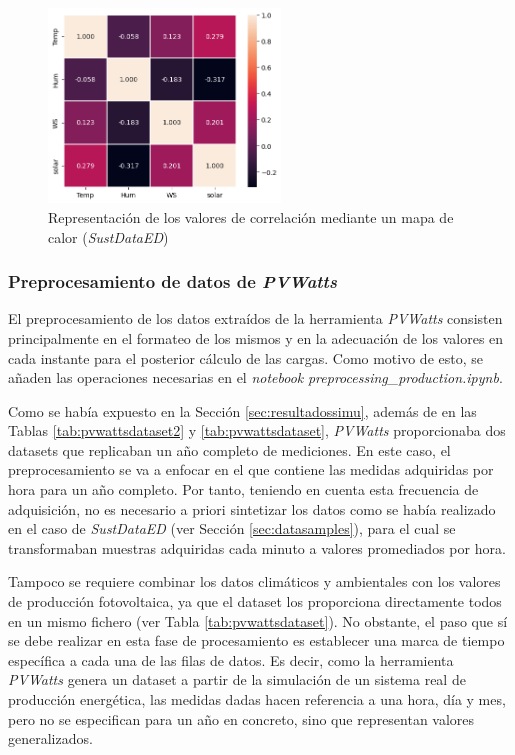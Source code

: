 \begin{figure}[H]
  \centering
  \includegraphics[width=0.55\textwidth]{img/diseno/corr2.png}
  \caption{Representación de los valores de correlación mediante un mapa de calor (\textit{SustDataED})}
  \label{fig:corr2}
\end{figure}

\subsubsection{Preprocesamiento de datos de \textit{PVWatts}}
\label{sec:preprocpvwatts}

El preprocesamiento de los datos extraídos de la herramienta \textit{PVWatts} consisten principalmente en el formateo de los mismos y en la adecuación de los valores en cada instante para el posterior cálculo de las cargas. Como motivo de esto, se añaden las operaciones necesarias en el \textit{notebook} \textit{preprocessing\_production.ipynb}. 

\vspace{3mm}

Como se había expuesto en la Sección \ref{sec:resultadossimu}, además de en las Tablas \ref{tab:pvwattsdataset2} y \ref{tab:pvwattsdataset}, \textit{PVWatts} proporcionaba dos datasets que replicaban un año completo de mediciones. En este caso, el preprocesamiento se va a enfocar en el que contiene las medidas adquiridas por hora para un año completo. Por tanto, teniendo en cuenta esta frecuencia de adquisición, no es necesario a priori sintetizar los datos como se había realizado en el caso de \textit{SustDataED} (ver Sección \ref{sec:datasamples}), para el cual se transformaban muestras adquiridas cada minuto a valores promediados por hora.

\vspace{3mm}

Tampoco se requiere combinar los datos climáticos y ambientales con los valores de producción fotovoltaica, ya que el dataset los proporciona directamente todos en un mismo fichero (ver Tabla \ref{tab:pvwattsdataset}). No obstante, el paso que sí se debe realizar en esta fase de procesamiento es establecer una marca de tiempo específica a cada una de las filas de datos. Es decir, como la herramienta \textit{PVWatts} genera un dataset a partir de la simulación de un sistema real de producción energética, las medidas dadas hacen referencia a una hora, día y mes, pero no se especifican para un año en concreto, sino que representan valores generalizados. 

